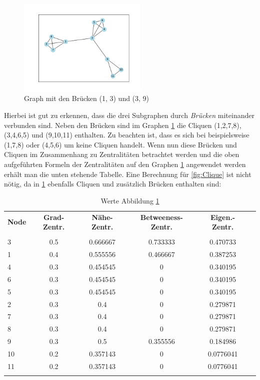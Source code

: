 \FloatBarrier
\begin{figure}[htb!]
    \centering
    \includegraphics[width=0.55\textwidth]{Graphics/Bridge.png}
    \caption{Graph mit den Brücken (1, 3) und (3, 9)}
    \label{fig:Bridge}
\end{figure}
Hierbei ist gut zu erkennen, dass die drei Subgraphen durch \textit{Brücken} miteinander verbunden sind. Neben den Brücken sind im Graphen \ref{fig:Bridge} die Cliquen (1,2,7,8), (3,4,6,5) und (9,10,11) enthalten. Zu beachten ist, dass es sich bei beispielsweise (1,7,8) oder (4,5,6) um keine Cliquen handelt. Wenn nun diese Brücken und Cliquen im Zusammenhang zu Zentralitäten  betrachtet werden und die oben aufgeführten Formeln der Zentralitäten auf den Graphen \ref{fig:Bridge} angewendet werden erhält man die unten stehende Tabelle. Eine Berechnung für \ref{fig:Clique} ist nicht nötig, da in \ref{fig:Bridge} ebenfalls Cliquen und zusätzlich Brücken enthalten sind:
\begin{table}[h!]
\centering
\footnotesize
\caption{Werte Abbildung \ref{fig:Bridge}}
\label{table:TableCliqueBridg}
\begin{tabular}{lccccc}\toprule
\textbf{Node} & \textbf{Grad-Zentr.} &\textbf{Nähe-Zentr.} &\textbf{Betweeness-Zentr.} & \textbf{Eigen.-Zentr.} \\
 &\\\midrule
  3 & 0.5 & 0.666667 & 0.733333 & 0.470733  \\
  1 & 0.4 & 0.555556 & 0.466667 & 0.387253  \\
  4 & 0.3 & 0.454545 & 0        & 0.340195  \\
  6 & 0.3 & 0.454545 & 0        & 0.340195  \\
  5 & 0.3 & 0.454545 & 0        & 0.340195  \\
  2 & 0.3 & 0.4      & 0        & 0.279871  \\
  7 & 0.3 & 0.4      & 0        & 0.279871  \\
  8 & 0.3 & 0.4      & 0        & 0.279871  \\
  9 & 0.3 & 0.5      & 0.355556 & 0.184986  \\
 10 & 0.2 & 0.357143 & 0        & 0.0776041 \\
 11 & 0.2 & 0.357143 & 0        & 0.0776041 \\
       
  \\\bottomrule
 \end{tabular}
 \end{table}


